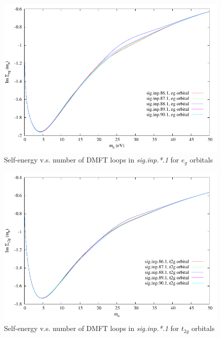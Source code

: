 \documentclass[12 pt]{article}
\begin{document}
\begin{itemize}[leftmargin=0.2in]
  \begin{figure}[ht]
    \centering
    \caption{Self-energy v.s. number of DMFT loops in \emph{sig.inp.*.1} for $e_g$ orbitals}
    \label{Self-energy v.s. number of DMFT loops in sig.inp.*.1 for eg orbitals}
    \vspace{2ex}
    \includegraphics[scale=1.3]{gnuplotSelfEnergysiginpeg}
  \end{figure}

  \cleardoublepage

  \begin{figure}[ht]
    \centering
    \caption{Self-energy v.s. number of DMFT loops in \emph{sig.inp.*.1} for $t_{2g}$ orbitals}
    \label{Self-energy v.s. number of DMFT loops in sig.inp.*.1 for t2g orbitals}
    \vspace{2ex}
    \includegraphics[scale=1.3]{gnuplotSelfEnergysiginpt2g}
  \end{figure}


\end{itemize}
\end{document}
